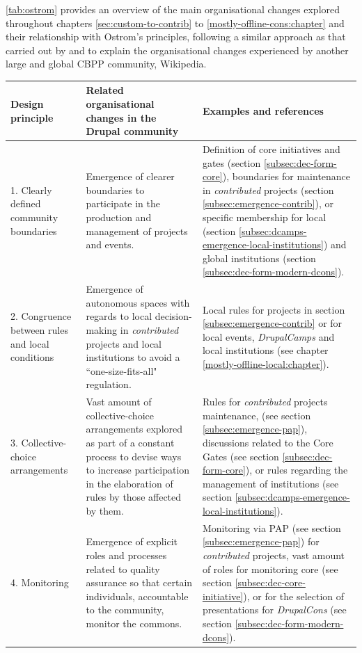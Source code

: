 \ref{tab:ostrom} provides an overview of the main organisational changes explored throughout chapters \ref{sec:custom-to-contrib} to \ref{mostly-offline-cons:chapter} and their relationship with Ostrom's principles, following a similar approach as that carried out by \textcite{viegas2007hidden} and \textcite{forte2009decentralization} to explain the organisational changes experienced by another large and global CBPP community, Wikipedia.

\begin{footnotesize}
\begin{longtable}{|p{3cm}||p{4.7cm}|p{5.5cm}|}
\hline
Design principle & Related organisational changes in the Drupal community & Examples and references \\ \hline \hline
1. Clearly defined community boundaries
&
Emergence of clearer boundaries to participate in the production and management of projects and events.
&
Definition of core initiatives and gates (section \ref{subsec:dec-form-core}), boundaries for maintenance in \textit{contributed} projects (section \ref{subsec:emergence-contrib}), or specific membership for local (section \ref{subsec:dcamps-emergence-local-institutions}) and global institutions (section \ref{subsec:dec-form-modern-dcons}).
\\ \hline
2. Congruence between rules and local conditions
&
Emergence of autonomous spaces with regards to local decision-making in \textit{contributed} projects and local institutions to avoid a ``one-size-fits-all" regulation.
&
Local rules for projects in section \ref{subsec:emergence-contrib} or for local events, \textit{DrupalCamps} and local institutions (see chapter \ref{mostly-offline-local:chapter}).
\\ \hline
3. Collective-choice arrangements
&
Vast amount of collective-choice arrangements explored as part of a constant process to devise ways to increase participation in the elaboration of rules by those affected by them.
&
Rules for \textit{contributed} projects maintenance, (see section \ref{subsec:emergence-pap}), discussions related to the Core Gates (see section \ref{subsec:dec-form-core}), or rules regarding the management of institutions (see section \ref{subsec:dcamps-emergence-local-institutions}).
\\ \hline
4. Monitoring
&
Emergence of explicit roles and processes related to quality assurance so that certain individuals, accountable to the community, monitor the commons.
&
Monitoring via PAP (see section \ref{subsec:emergence-pap}) for \textit{contributed} projects, vast amount of roles for monitoring core (see section  \ref{subsec:dec-core-initiative}), or for the selection of presentations for \textit{DrupalCons} (see section \ref{subsec:dec-form-modern-dcons}).

\end{longtable}
\end{footnotesize}

